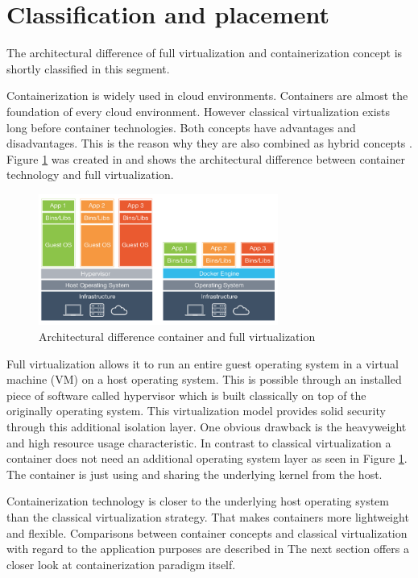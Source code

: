 \section{Classification and placement}
\label{sec:intro:virt_and_cont}
The architectural difference of full virtualization and containerization concept is shortly classified in this segment.

Containerization is widely used in cloud environments. Containers are almost the foundation of every cloud environment.
However classical virtualization exists long before container technologies.
Both concepts have advantages and disadvantages. 
This is the reason why they are also combined as hybrid concepts \cite{6498558}.
Figure \ref{fig:intro:diff_container_vm} was created in \cite{evol_cont} and shows the architectural difference between container technology and full virtualization.
 
\begin{figure}[htbp]
 \centering
 \includegraphics[width=0.7\textwidth]{gfx/examples/os_virt_diff}
 \caption{Architectural difference container and full virtualization}
 \label{fig:intro:diff_container_vm}
\end{figure}
Full virtualization allows it to run an entire guest operating system in a virtual machine (VM) on a host operating system. 
This is possible through an installed piece of software called hypervisor which is built classically on top of the originally operating system. 
This virtualization model provides solid security through this additional isolation layer. 
One obvious drawback is the heavyweight and high resource usage characteristic.
In contrast to classical virtualization a container does not need an additional operating system layer as seen in Figure \ref{fig:intro:diff_container_vm}. 
The container is just using and sharing the underlying kernel from the host. 

Containerization technology is closer to the underlying host operating system than the classical virtualization strategy. 
That makes containers more lightweight and flexible. 
Comparisons between container concepts and classical virtualization with regard to the application purposes are described in \cite{7921010}
The next section offers a closer look at containerization paradigm itself.

